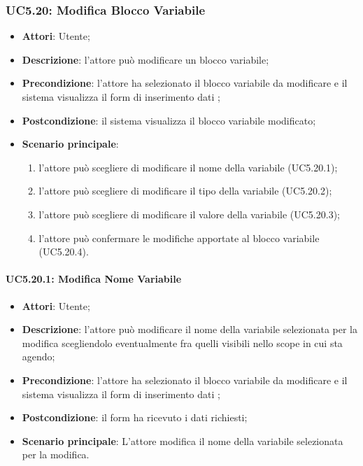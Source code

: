 \begin{itemize}
\begin{itemize}
\begin{itemize}
\begin{itemize}
\subsubsection{UC5.20: Modifica Blocco Variabile}
\label{UC5.20}
\begin{itemize}
	\item \textbf{Attori}: Utente;
	\item \textbf{Descrizione}: l'attore può modificare un blocco variabile;
	\item \textbf{Precondizione}: l'attore ha selezionato il blocco variabile da modificare e il sistema visualizza il form di inserimento dati ;
	\item \textbf{Postcondizione}: il sistema visualizza il blocco variabile modificato;
	\item \textbf{Scenario principale}:
	\begin{enumerate}
		\item l'attore può scegliere di modificare il nome della variabile (UC5.20.1);
		\item l'attore può scegliere di modificare il tipo della variabile (UC5.20.2);
		\item l'attore può scegliere di modificare il valore della variabile (UC5.20.3);
		\item l'attore può confermare le modifiche apportate al blocco variabile (UC5.20.4).
	\end{enumerate}
\end{itemize}

\paragraph{UC5.20.1: Modifica Nome Variabile}
\label{UC5.20.1}
\begin{itemize}
	\item \textbf{Attori}: Utente;
	\item \textbf{Descrizione}: l'attore può modificare il nome della variabile selezionata per la modifica scegliendolo eventualmente fra quelli visibili nello scope in cui sta agendo;
	\item \textbf{Precondizione}: l'attore ha selezionato il blocco variabile da modificare e il sistema visualizza il form di inserimento dati ;
	\item \textbf{Postcondizione}: il form ha ricevuto i dati richiesti;
	\item \textbf{Scenario principale}: L'attore modifica il nome della variabile selezionata per la modifica.
\end{itemize}


\end{itemize}
\end{itemize}
\end{itemize}
\end{itemize}
